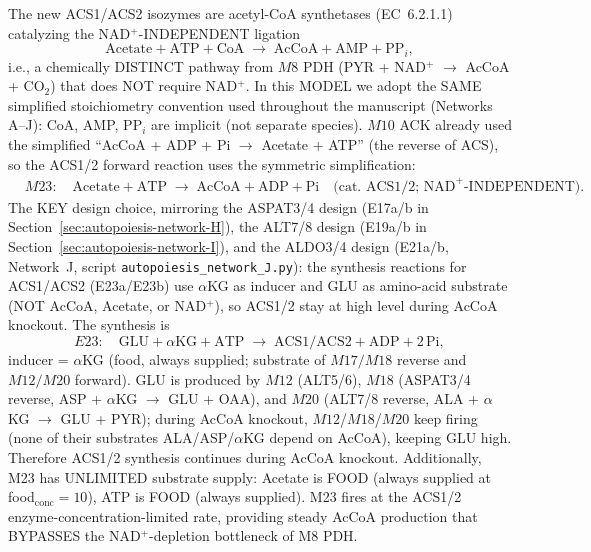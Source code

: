 \documentclass[11pt,a4paper]{article}
\theoremstyle{plain}
\theoremstyle{definition}
\theoremstyle{remark}
\begin{document}
The new ACS1/ACS2 isozymes are acetyl-CoA synthetases (EC~6.2.1.1)
catalyzing the NAD$^+$-INDEPENDENT ligation
\[
  \mathrm{Acetate} + \mathrm{ATP} + \mathrm{CoA}
  \;\longrightarrow\; \mathrm{AcCoA} + \mathrm{AMP} + \mathrm{PP}_i,
\]
i.e., a chemically DISTINCT pathway from $M8$ PDH (PYR + NAD$^+$ $\to$
AcCoA + CO$_2$) that does NOT require NAD$^+$. In this MODEL we adopt
the SAME simplified stoichiometry convention used throughout the
manuscript (Networks A--J): CoA, AMP, PP$_i$ are implicit (not
separate species). $M10$ ACK already used the simplified
``AcCoA + ADP + Pi $\to$ Acetate + ATP'' (the reverse of ACS), so the
ACS1/2 forward reaction uses the symmetric simplification:
\begin{equation}\label{eq:netK-M23}
\begin{aligned}
  &M23: \quad \mathrm{Acetate} + \mathrm{ATP} \;\to\;
  \mathrm{AcCoA} + \mathrm{ADP} + \mathrm{Pi}
  \quad \text{(cat.\ ACS1/2; NAD}^+\text{-INDEPENDENT)}.
\end{aligned}
\end{equation}
The KEY design choice, mirroring the ASPAT3/4 design (E17a/b in
Section~\ref{sec:autopoiesis-network-H}), the ALT7/8 design (E19a/b
in Section~\ref{sec:autopoiesis-network-I}), and the ALDO3/4 design
(E21a/b, Network~J, script \texttt{autopoiesis\_network\_J.py}): the synthesis
reactions for ACS1/ACS2 (E23a/E23b) use $\alpha$KG as inducer and GLU
as amino-acid substrate (NOT AcCoA, Acetate, or NAD$^+$), so ACS1/2
stay at high level during AcCoA knockout. The synthesis is
\[
  E23: \quad \mathrm{GLU} + \alpha\mathrm{KG} + \mathrm{ATP} \;\to\;
  \mathrm{ACS1}/\mathrm{ACS2} + \mathrm{ADP} + 2\,\mathrm{Pi},
\]
inducer = $\alpha$KG (food, always supplied; substrate of $M17/M18$
reverse and $M12/M20$ forward). GLU is produced by $M12$ (ALT5/6),
$M18$ (ASPAT3/4 reverse, ASP + $\alpha$KG $\to$ GLU + OAA), and $M20$
(ALT7/8 reverse, ALA + $\alpha$KG $\to$ GLU + PYR); during AcCoA
knockout, $M12$/$M18$/$M20$ keep firing (none of their substrates
ALA/ASP/$\alpha$KG depend on AcCoA), keeping GLU high. Therefore
ACS1/2 synthesis continues during AcCoA knockout. Additionally, M23
has UNLIMITED substrate supply: Acetate is FOOD (always supplied at
food$_{\mathrm{conc}} = 10$), ATP is FOOD (always supplied). M23 fires
at the ACS1/2 enzyme-concentration-limited rate, providing steady
AcCoA production that BYPASSES the NAD$^+$-depletion bottleneck of M8
PDH.
\end{document}

